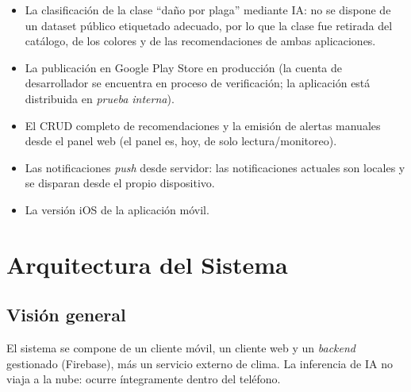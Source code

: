 \documentclass[12pt,a4paper]{article}
\begin{document}
\begin{itemize}
  \item La clasificación de la clase ``daño por plaga'' mediante IA: no se
        dispone de un dataset público etiquetado adecuado, por lo que la clase
        fue retirada del catálogo, de los colores y de las recomendaciones de
        ambas aplicaciones.
  \item La publicación en Google Play Store en producción (la cuenta de
        desarrollador se encuentra en proceso de verificación; la aplicación está
        distribuida en \textit{prueba interna}).
  \item El CRUD completo de recomendaciones y la emisión de alertas manuales
        desde el panel web (el panel es, hoy, de solo lectura/monitoreo).
  \item Las notificaciones \textit{push} desde servidor: las notificaciones
        actuales son locales y se disparan desde el propio dispositivo.
  \item La versión iOS de la aplicación móvil.
\end{itemize}

\section{Arquitectura del Sistema}

\subsection{Visión general}

El sistema se compone de un cliente móvil, un cliente web y un \textit{backend}
gestionado (Firebase), más un servicio externo de clima. La inferencia de IA no
viaja a la nube: ocurre íntegramente dentro del teléfono.
\end{document}
